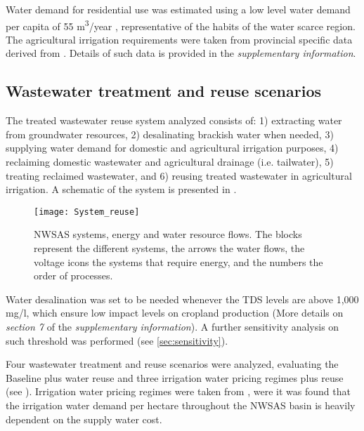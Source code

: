 Water demand for residential use was estimated using a low level water demand per capita of 55 m\textsuperscript{3}/year \cite{Householdwaterconsumption2014}, representative of the habits of the water scarce region. The agricultural irrigation requirements were taken from provincial specific data derived from \cite{Socioeconomicaspectsirrigation2014}. Details of such data is provided in the \textit{supplementary information}.

\subsection{Wastewater treatment and reuse scenarios}
The treated wastewater reuse system analyzed consists of: 1) extracting water from groundwater resources, 2) desalinating brackish water when needed, 3) supplying water demand for domestic and agricultural irrigation purposes, 4) reclaiming domestic wastewater and agricultural drainage (i.e. tailwater), 5) treating reclaimed wastewater, and 6) reusing treated wastewater in agricultural irrigation. A schematic of the system is presented in .

\begin{figure*}[!ht]
	\centering
	\texttt{[image: System\_reuse]}
	\caption{NWSAS systems, energy and water resource flows. The blocks represent the different systems, the arrows the water flows, the voltage icons the systems that require energy, and the numbers the order of processes.}
	\label{fig:systemreuse}
\end{figure*}

Water desalination was set to be needed whenever the TDS levels are above 1,000 mg/l, which ensure low impact levels on cropland production \cite{fao1985water} (More details on \textit{section 7} of the \textit{supplementary information}). A further sensitivity analysis on such threshold was performed (see \autoref{sec:sensitivity}).

Four wastewater treatment and reuse scenarios were analyzed, evaluating the Baseline plus water reuse and three irrigation water pricing regimes plus reuse (see ). Irrigation water pricing regimes were taken from \cite{Socioeconomicaspectsirrigation2014}, were it was found that the irrigation water demand per hectare throughout the NWSAS basin is heavily dependent on the supply water cost. 

